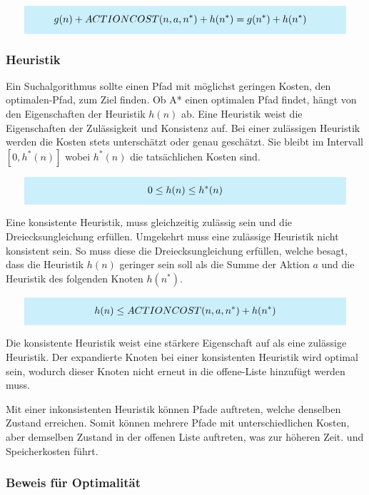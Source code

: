 \[
\highlightbox{0.9\textwidth}{$
    \begin{aligned}
			g(n) + ACTIONCOST(n,a,n^*) + h(n^*) &= g(n^*) + h(n^*)
    \end{aligned}
$}
\]

\subsubsection{Heuristik}

Ein Suchalgorithmus sollte einen Pfad mit möglichst geringen Kosten, den optimalen-Pfad, zum Ziel finden. Ob A* einen optimalen Pfad findet, hängt von den Eigenschaften der Heuristik $h(n)$ ab. Eine Heuristik weist die Eigenschaften der Zulässigkeit und Konsistenz auf.
Bei einer zulässigen Heuristik werden die Kosten stets unterschätzt oder genau geschätzt. Sie bleibt im Intervall $[0, h^{\ast}(n)]$ wobei $h^{\ast}(n)$ die tatsächlichen Kosten sind.

\[
\highlightbox{0.9\textwidth}{$
    \begin{aligned}
			0 \leq h(n) \leq h^*(n)
    \end{aligned}
$}
\]

Eine konsistente Heuristik, muss gleichzeitig zulässig sein und die Dreiecksungleichung erfüllen. Umgekehrt muss eine zulässige Heuristik nicht konsistent sein. So muss diese die Dreiecksungleichung erfüllen, welche besagt, dass die Heuristik $h(n)$ geringer sein soll als die Summe der Aktion $a$ und die Heuristik des folgenden Knoten $h(n^*)$.

\[
\highlightbox{0.9\textwidth}{$
    \begin{aligned}
			h(n) \leq ACTIONCOST(n,a,n^*) + h(n^*)
    \end{aligned}
$}
\]

Die konsistente Heuristik weist eine stärkere Eigenschaft auf als eine zulässige Heuristik. Der expandierte Knoten bei einer konsistenten Heuristik wird optimal sein, wodurch dieser Knoten nicht erneut in die offene-Liste hinzufügt werden muss.

Mit einer inkonsistenten Heuristik können Pfade auftreten, welche denselben Zustand erreichen. Somit können mehrere Pfade mit unterschiedlichen Kosten, aber demselben Zustand in der offenen Liste auftreten, was zur höheren Zeit. und Speicherkosten führt.

\subsubsection{Beweis für Optimalität}

